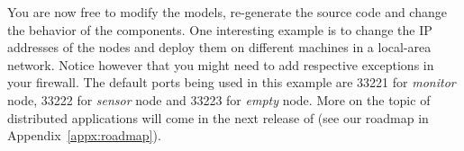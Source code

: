 You are now free to modify the models, re-generate the source code and change the behavior of the components.
One interesting example is to change the IP addresses of the nodes and deploy them on different machines in a local-area network.
Notice however that you might need to add respective exceptions in your firewall.
The default ports being used in this example are 33221 for \textit{monitor} node, 33222 for \textit{sensor} node and 33223 for \textit{empty} node.
More on the topic of distributed applications will come in the next release of \xme (see our roadmap in Appendix~\ref{appx:roadmap}).
